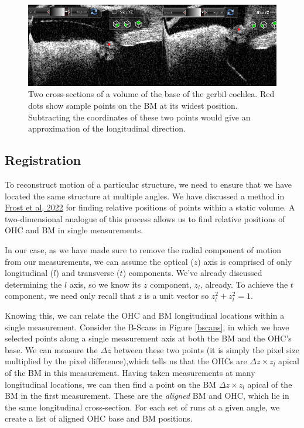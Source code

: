 \documentclass{article}
\begin{document}
\begin{figure}
	\centering
	\includegraphics[width=\textwidth]{Figures/points.png}
	\caption{Two cross-sections of a volume of the base of the gerbil cochlea. Red dots show sample points on the BM at its widest position. Subtracting the coordinates of these two points would give an approximation of the longitudinal direction.}
\label{pointselect}
\end{figure}


\subsection{Registration}
\par{To reconstruct motion of a particular structure, we need to ensure that we have located the same structure at multiple angles. We have discussed a method in \href{https://asa.scitation.org/doi/full/10.1121/10.0009576}{Frost et al, 2022} for finding relative positions of points within a static volume. A two-dimensional analogue of this process allows us to find relative positions of OHC and BM in single measurements.}
\par{In our case, as we have made sure to remove the radial component of motion from our measurements, we can assume the optical ($z$) axis is comprised of only longitudinal ($l$) and transverse ($t$) components. We've already discussed determining the $l$ axis, so we know its $z$ component, $z_l$, already. To achieve the $t$ component, we need only recall that $z$ is a unit vector so $z_l^2 + z_t^2 = 1$.}
\par{Knowing this, we can relate the OHC and BM longitudinal locations within a single measurement. Consider the B-Scans in Figure \ref{bscans}, in which we have selected points along a single measurement axis at both the BM and the OHC's base. We can measure the $\Delta z$ between these two points (it is simply the pixel size multiplied by the pixel difference),which tells us that the OHCs are $\Delta z \times z_l$ apical of the BM in this measurement. Having taken measurements at many longitudinal locations, we can then find a point on the BM $\Delta z \times z_l$ apical of the BM in the first measurement. These are the \textit{aligned} BM and OHC, which lie in the same longitudinal cross-section. For each set of runs at a given angle, we create a list of aligned OHC base and BM positions.}
\end{document}
